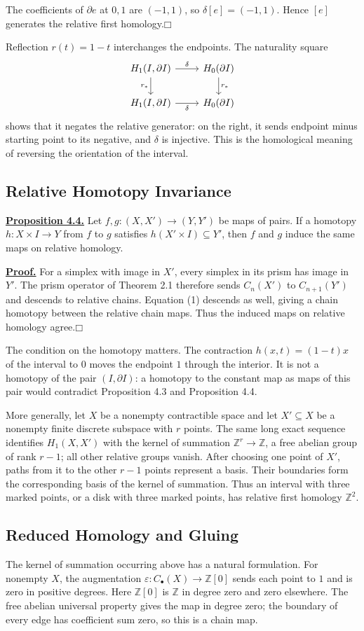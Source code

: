 \documentclass[11pt]{article}
\newcommand{\facehead}[1]{\par\Needspace{4\baselineskip}\subsection{#1}}
\begin{document}
The coefficients of $\partial e$ at $0,1$ are $(-1,1)$, so $\delta[e]=(-1,1)$. Hence $[e]$ generates the relative first homology.\hfill$\mdlgwhtsquare$

Reflection $r(t)=1-t$ interchanges the endpoints. The naturality square
\[
\begin{tikzcd}
H_1(I,\partial I)\arrow[r,"\delta"]\arrow[d,"r_*"']&H_0(\partial I)\arrow[d,"r_*"]\\
H_1(I,\partial I)\arrow[r,"\delta"']&H_0(\partial I)
\end{tikzcd}
\]
shows that it negates the relative generator: on the right, it sends endpoint minus starting point to its negative, and $\delta$ is injective. This is the homological meaning of reversing the orientation of the interval.

\facehead{Relative Homotopy Invariance}
\hypertarget{prop34}{}\textbf{\hyperlink{proof34}{Proposition 4.4.}} Let $f,g:(X,X')\to(Y,Y')$ be maps of pairs. If a homotopy $h:X\times I\to Y$ from $f$ to $g$ satisfies $h(X'\times I)\subseteq Y'$, then $f$ and $g$ induce the same maps on relative homology.

\hypertarget{proof34}{}\textbf{\hyperlink{prop34}{Proof.}} For a simplex with image in $X'$, every simplex in its prism has image in $Y'$. The prism operator of Theorem 2.1 therefore sends $C_n(X')$ to $C_{n+1}(Y')$ and descends to relative chains. Equation (1) descends as well, giving a chain homotopy between the relative chain maps. Thus the induced maps on relative homology agree.\hfill$\mdlgwhtsquare$

The condition on the homotopy matters. The contraction $h(x,t)=(1-t)x$ of the interval to $0$ moves the endpoint $1$ through the interior. It is not a homotopy of the pair $(I,\partial I)$: a homotopy to the constant map as maps of this pair would contradict Proposition 4.3 and Proposition 4.4.

More generally, let $X$ be a nonempty contractible space and let $X'\subseteq X$ be a nonempty finite discrete subspace with $r$ points. The same long exact sequence identifies $H_1(X,X')$ with the kernel of summation $\mathbb Z^r\to\mathbb Z$, a free abelian group of rank $r-1$; all other relative groups vanish. After choosing one point of $X'$, paths from it to the other $r-1$ points represent a basis. Their boundaries form the corresponding basis of the kernel of summation. Thus an interval with three marked points, or a disk with three marked points, has relative first homology $\mathbb Z^2$.

\facehead{Reduced Homology and Gluing}
The kernel of summation occurring above has a natural formulation. For nonempty $X$, the augmentation $\varepsilon:C_\bullet(X)\to\mathbb Z[0]$ sends each point to $1$ and is zero in positive degrees. Here $\mathbb Z[0]$ is $\mathbb Z$ in degree zero and zero elsewhere. The free abelian universal property gives the map in degree zero; the boundary of every edge has coefficient sum zero, so this is a chain map.
\end{document}

